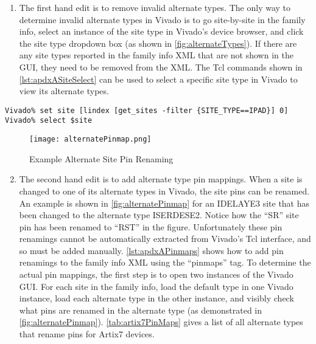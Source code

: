 \begin{enumerate}
  \item The first hand edit is to remove invalid alternate types. The only way
  to determine invalid alternate types in Vivado is to go site-by-site in the
  family info, select an instance of the site type in Vivado's device browser, and
  click the site type dropdown box (as shown in \autoref{fig:alternateTypes}).
  If there are any site types reported in the family info XML that are not
  shown in the GUI, they need to be removed from the XML. The Tcl commands
  shown in \autoref{lst:apdxASiteSelect} can be used to select a specific site
  type in Vivado to view its alternate types.

\end{enumerate}
 
\begin{lstlisting}[numbers=none, caption=Tcl commands to select a Vivado Site
object, label=lst:apdxASiteSelect]
Vivado% set site [lindex [get_sites -filter {SITE_TYPE==IPAD}] 0]
Vivado% select $site
\end{lstlisting}

\begin{figure}[b!]
  \centering
  \texttt{[image: alternatePinmap.png]}
  \caption{Example Alternate Site Pin Renaming}
  \label{fig:alternatePinmap}
\end{figure}

\begin{enumerate}
\setcounter{enumi}{1}         
      \item  The second hand edit is to add alternate type pin mappings. When a
      site is changed to one of its alternate types in Vivado, the site pins can
      be renamed. An example is shown in \autoref{fig:alternatePinmap} for an
      IDELAYE3 site that has been changed to the alternate type ISERDESE2.
      Notice how the ``SR'' site pin has been renamed to ``RST'' in the figure.
      Unfortunately these pin renamings cannot be automatically extracted from
      Vivado's Tcl interface, and so must be added manually.
      \autoref{lst:apdxAPinmaps} shows how to add pin renamings to the family
      info XML using the ``pinmaps'' tag. To determine the actual pin
      mappings, the first step is to open two instances of the Vivado GUI.
      For each site in the family info, load the default type in one Vivado
      instance, load each alternate type in the other instance, and visibly
      check what pins are renamed in the alternate type (as demonstrated in
      \autoref{fig:alternatePinmap}). \autoref{tab:artix7PinMaps} gives a list
      of all alternate types that rename pins for Artix7 devices.

\end{enumerate}

